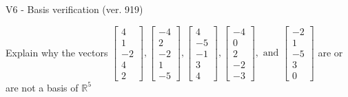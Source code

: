\begin{exercise}
  \begin{exerciseTitle}V6 - Basis verification (ver. 919)\end{exerciseTitle}
  \begin{exerciseStatement}
    Explain why the vectors \(\left[\begin{array}{r}
4 \\
1 \\
-2 \\
4 \\
2
\end{array}\right] , \left[\begin{array}{r}
-4 \\
2 \\
-2 \\
1 \\
-5
\end{array}\right] , \left[\begin{array}{r}
4 \\
-5 \\
-1 \\
3 \\
4
\end{array}\right] , \left[\begin{array}{r}
-4 \\
0 \\
2 \\
-2 \\
-3
\end{array}\right] , \text{ and } \left[\begin{array}{r}
-2 \\
1 \\
-5 \\
3 \\
0
\end{array}\right]\) are or are not a basis of \(\mathbb{R}^5\)	



\end{exerciseStatement}
\end{exercise}
